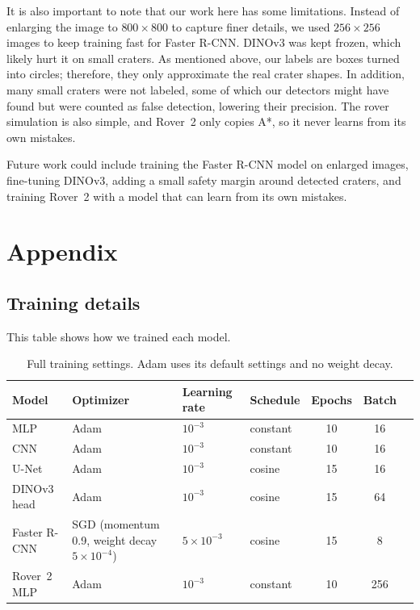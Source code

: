 \documentclass{article} %
\begin{document}
It is also important to note that our work here has some limitations. Instead of enlarging the image to $800 \times 800$ to capture finer details, we used $256 \times 256$ images to keep training fast for Faster R-CNN. DINOv3 was kept frozen, which likely hurt it on small craters. As mentioned above, our labels are boxes turned into circles; therefore, they only approximate the real crater shapes. In addition, many small craters were not labeled, some of which our detectors might have found but were counted as false detection, lowering their precision. The rover simulation is also simple, and Rover~2 only copies A*, so it never learns from its own mistakes.

Future work could include training the Faster R-CNN model on enlarged images, fine-tuning DINOv3, adding a small safety margin around detected craters, and training Rover~2 with a model that can learn from its own mistakes.





\clearpage



\appendix
\vspace{-10pt}
\section{Appendix}
\label{sec:appendix}

\subsection{Training details}
\label{app:training}
This table shows how we trained each model.
\begin{table}[H]
  \centering
  \begin{tabular}{llllccl}
    \toprule
    Model & Optimizer & Learning rate & Schedule & Epochs & Batch & \\
    \midrule
    MLP & Adam & $10^{-3}$ & constant & 10 & 16  \\
    CNN & Adam & $10^{-3}$ & constant & 10 & 16  \\
    U-Net & Adam & $10^{-3}$ & cosine & 15 & 16  \\
    DINOv3 head & Adam & $10^{-3}$ & cosine & 15 & 64 \\
    Faster R-CNN & SGD (momentum 0.9, weight decay $5 \times 10^{-4}$) & $5 \times 10^{-3}$ & cosine & 15 & 8  \\
    Rover~2 MLP & Adam & $10^{-3}$ & constant & 10 & 256  \\
    \bottomrule
  \end{tabular}
  \caption{Full training settings. Adam uses its default settings and no weight decay.}
  \label{tab:app_training}
\end{table}
\end{document}
